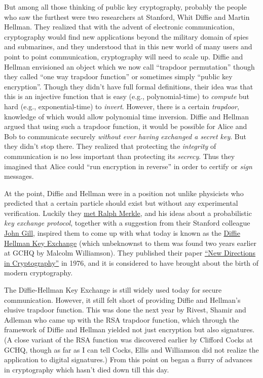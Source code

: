 But among all those thinking of public key cryptography, probably the
people who saw the furthest were two researchers at Stanford, Whit
Diffie and Martin Hellman. They realized that with the advent of
electronic communication, cryptography would find new applications
beyond the military domain of spies and submarines, and they understood
that in this new world of many users and point to point communication,
cryptography will need to scale up. Diffie and Hellman envisioned an
object which we now call ``trapdoor permutation'' though they called
``one way trapdoor function'' or sometimes simply ``public key
encryption''. Though they didn't have full formal definitions, their
idea was that this is an injective function that is easy (e.g.,
polynomial-time) to \emph{compute} but hard (e.g., exponential-time) to
\emph{invert}. However, there is a certain \emph{trapdoor}, knowledge of
which would allow polynomial time inversion. Diffie and Hellman argued
that using such a trapdoor function, it would be possible for Alice and
Bob to communicate securely \emph{without ever having exchanged a secret
key}. But they didn't stop there. They realized that protecting the
\emph{integrity} of communication is no less important than protecting
its \emph{secrecy}. Thus they imagined that Alice could ``run encryption
in reverse'' in order to certify or \emph{sign} messages.

At the point, Diffie and Hellman were in a position not unlike
physicists who predicted that a certain particle should exist but
without any experimental verification. Luckily they
\href{http://cr.yp.to/bib/1988/diffie.pdf}{met Ralph Merkle}, and his
ideas about a probabilistic \emph{key exchange protocol}, together with
a suggestion from their Stanford colleague
\href{http://hdl.handle.net/11299/107353}{John Gill}, inspired them to
come up with what today is known as the
\href{https://en.wikipedia.org/wiki/Diffie\%E2\%80\%93Hellman_key_exchange}{Diffie
Hellman Key Exchange} (which unbeknownst to them was found two years
earlier at GCHQ by Malcolm Williamson). They published their paper
\href{https://www-ee.stanford.edu/~hellman/publications/24.pdf}{``New
Directions in Cryptography''} in 1976, and it is considered to have
brought about the birth of modern cryptography.

The Diffie-Hellman Key Exchange is still widely used today for secure
communication. However, it still felt short of providing Diffie and
Hellman's elusive trapdoor function. This was done the next year by
Rivest, Shamir and Adleman who came up with the RSA trapdoor function,
which through the framework of Diffie and Hellman yielded not just
encryption but also signatures. (A close variant of the RSA function was
discovered earlier by Clifford Cocks at GCHQ, though as far as I can
tell Cocks, Ellis and Williamson did not realize the application to
digital signatures.) From this point on began a flurry of advances in
cryptography which hasn't died down till this day.


